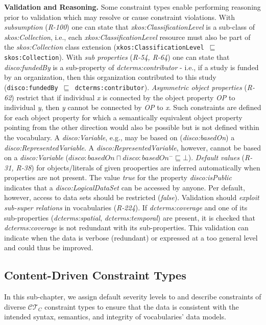 \documentclass{llncs}
\newcommand{\ms}[1]{\texttt{#1}}
\begin{document}
\textbf{Validation and Reasoning.}
Some constraint types enable performing reasoning prior to validation which may resolve or cause constraint violations.
With \emph{subsumption} (\emph{R-100}) one can state that \emph{xkos:ClassificationLevel} is a sub-class of \emph{skos:Collection}, i.e., each \emph{xkos:ClassificationLevel} resource must also be part of the \emph{skos:Collection} class extension (\ms{xkos:ClassificationLevel $\sqsubseteq$ skos:Collection}).
With \emph{sub properties} (\emph{R-54, R-64}) one can state that \emph{disco:fundedBy} is a sub-property of \emph{dcterms:contributor} - i.e., if a study is funded by an organization, then this organization contributed to this study (\ms{disco:fundedBy $\sqsubseteq$ dcterms:contributor}).
\emph{Asymmetric object properties} (\emph{R-62}) restrict that if individual \emph{x} is connected by the object property \emph{OP} to individual \emph{y}, then \emph{y} cannot be connected by \emph{OP} to \emph{x}. 
Such constraints are defined for each object property for which a semantically equivalent object property pointing from the other direction would also be possible but is not defined within the vocabulary.
A \emph{disco:Variable}, e.g., may be based on (\emph{disco:basedOn}) a \emph{disco:RepresentedVariable}.
A \emph{disco:RepresentedVariable}, however, cannot be based on a \emph{disco:Variable} (\ms{$disco:basedOn \sqcap disco:basedOn^{-} \sqsubseteq \bot$}).
\emph{Default values} (\emph{R-31, R-38}) for objects/literals of given prooperties are inferred automatically when properties are not present.
The value \emph{true} for the property {\em disco:isPublic} indicates that a {\em disco:LogicalDataSet} can be accessed by anyone.
Per default, however, access to data sets should be restricted (\emph{false}).
Validation should \emph{exploit sub-super relations} in vocabularies (\emph{R-224}).
If \emph{dcterms:coverage} and one of its sub-properties (\emph{dcterms:spatial}, \emph{dcterms:temporal}) are present,
it is checked that \emph{dcterms:coverage} is not redundant with its sub-properties. 
This validation can indicate when the data is verbose (redundant) or expressed at a too general level and could thus be improved.

\subsection{Content-Driven Constraint Types}
\label{content-driven-validation}

In this sub-chapter, we assign default severity levels to and describe constraints of diverse $\mathcal{CT}_{C}$ constraint types 
to ensure that the data is consistent with the intended syntax, semantics, and integrity of vocabularies' data models.
\end{document}
